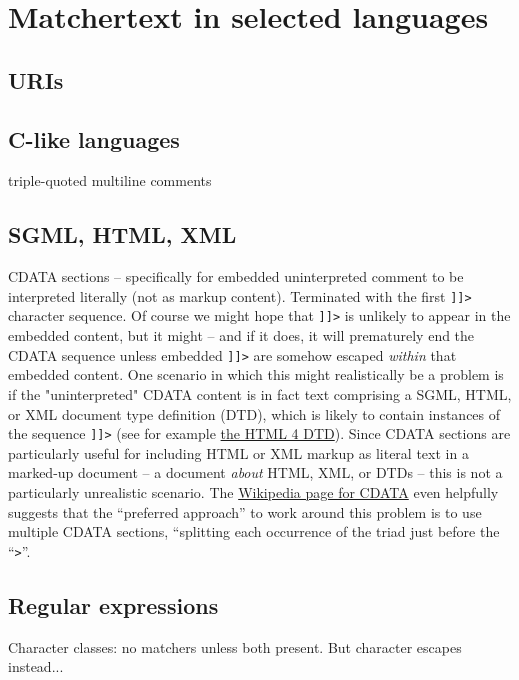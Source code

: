 \section{Matchertext in selected languages}
\label{sec:langs}

\subsection{URIs}

\subsection{C-like languages}

triple-quoted multiline comments

\subsection{SGML, HTML, XML}

CDATA sections -- specifically for embedded uninterpreted comment
to be interpreted literally (not as markup content).
Terminated with the first \verb|]]>| character sequence.
Of course we might hope that \verb|]]>| is unlikely to appear
in the embedded content, but it might --
and if it does, it will prematurely end the CDATA sequence
unless embedded \verb|]]>| are somehow escaped
\emph{within} that embedded content.
One scenario in which this might realistically be a problem
is if the "uninterpreted" CDATA content is in fact
text comprising a SGML, HTML, or XML document type definition (DTD),
which is likely to contain instances of the sequence \verb|]]>|
(see for example
\href{https://www.w3.org/TR/html4/sgml/dtd.html}{the HTML 4 DTD}).
Since CDATA sections are particularly useful
for including HTML or XML markup as literal text in a marked-up document --
\eg a document \emph{about} HTML, XML, or DTDs --
this is not a particularly unrealistic scenario.
The \href{https://en.wikipedia.org/wiki/CDATA}{Wikipedia page for CDATA}
even helpfully suggests that the ``preferred approach''
to work around this problem is to use multiple CDATA sections,
``splitting each occurrence of the triad
just before the ``\verb|>|''.


\subsection{Regular expressions}

Character classes: no matchers unless both present.
But character escapes instead...

